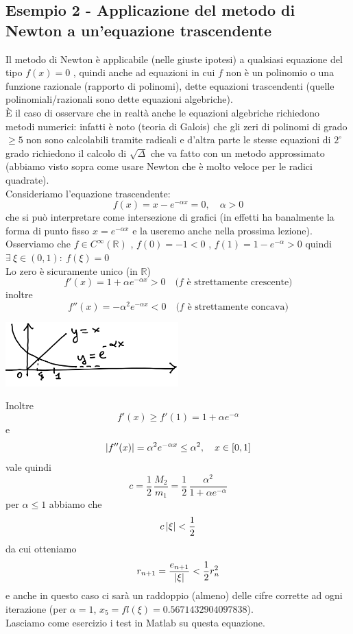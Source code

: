 \subsection{Esempio 2 - Applicazione del metodo di Newton a un'equazione trascendente}
Il metodo di Newton è applicabile (nelle giuste ipotesi) a qualsiasi equazione del tipo $f(x)=0$ , quindi anche ad equazioni in cui $f$ non è un polinomio o una funzione razionale (rapporto di polinomi), dette equazioni trascendenti (quelle polinomiali/razionali sono dette equazioni algebriche).\\
È il caso di osservare che in realtà anche le equazioni algebriche richiedono metodi numerici: infatti è noto (teoria di Galois) che gli zeri di polinomi di grado $\geq 5$ non sono calcolabili tramite radicali e d'altra parte le stesse equazioni di $2^{\circ}$ grado richiedono il calcolo di $\sqrt{\Delta}$ che va fatto con un metodo approssimato (abbiamo visto sopra come usare Newton che è molto veloce per le radici quadrate). \\
Consideriamo l'equazione trascendente: 
\[f(x)=x-e^{-\alpha x}=0 ,\quad \alpha>0 \]
che si può interpretare come intersezione di grafici (in effetti ha banalmente la forma di punto fisso $x=e^{-\alpha x}$ e la useremo anche nella prossima lezione).\\
Osserviamo che $f \in C^{\infty}(\mathbb{R})$ , $f(0)=-1<0$ , $f(1)=1-e^{-\alpha}>0$ quindi $\exists \  \xi \in (0,1):\ f(\xi)=0$\\
Lo zero è sicuramente unico (in $\mathbb{R}$)\\
\[f'(x)=1+\alpha e^{-\alpha x}>0 \quad \text{($f$ è strettamente crescente)}\]
inoltre \[f''(x)=-\alpha^2 e^{-\alpha x}<0 \quad \text{($f$ è strettamente concava)}\]
\begin{center}
\includegraphics[width=0.5\textwidth]{foto/pag34}
\end{center}
Inoltre 
\[ f'(x) \geq f'(1) = 1+ \alpha e^{-\alpha} \]
e
\[ \lvert f''(x)\rvert = \alpha^2 e^{-\alpha x} \leq \alpha^2, \quad x\in[0,1] \]
vale quindi
\[ c = \frac{1}{2}\,\frac{M_2}{m_1} = \frac{1}{2}\,\frac{\alpha^2}{1+\alpha e^{-\alpha}} \]
per $\alpha \leq 1$ abbiamo che 
\[ c\,\lvert\xi\rvert < \frac{1}{2} \]
da cui otteniamo
\begin{equation*}
    r_{n+1} = \frac{e_{n+1}}{\lvert\xi\rvert} < \frac{1}{2}r_n^2
\end{equation*}
e anche in questo caso ci sarà un raddoppio (almeno) delle cifre corrette ad ogni iterazione (per $\alpha = 1$, $x_5=fl(\xi)=0.5671432904097838$).\\
Lasciamo come esercizio i test in Matlab su questa equazione.


